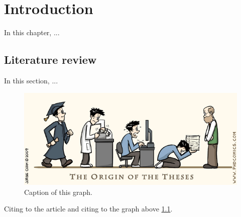 \chapter{Introduction}
In this chapter, ...


\section{Literature review}
In this section, ...

\begin{figure}[h!]
  \includegraphics[width=\linewidth]{charts/writing-thesis.png}
  \caption{Caption of this graph.}
  \label{fig:writing-thesis}
\end{figure}

Citing to the article \cite{Baroni1983} and citing to the graph above \ref{fig:writing-thesis}.